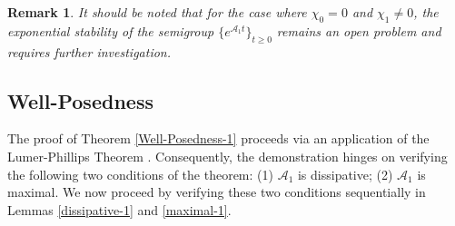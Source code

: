 \documentclass[11pt,reqno]{article}
\newtheorem{remark}[theorem]{Remark}
\begin{document}
    \begin{remark}
  	It should be noted that for the case where $\chi_0 = 0$ and $\chi_1 \neq 0$, the exponential stability of the semigroup $\{e^{\mathcal{A}_1 t}\}_{t \geq 0}$ remains an open problem and requires further investigation.
  \end{remark}

\subsection{Well-Posedness}\label{sec2.1}
The proof of Theorem \ref{Well-Posedness-1} proceeds via an application of the Lumer-Phillips Theorem \cite{MR710486}. Consequently, the demonstration hinges on verifying the following two conditions of the theorem: (1) $\mathcal{A}_1$ is dissipative; (2) $\mathcal{A}_1$ is maximal. We now proceed by verifying these two conditions sequentially in Lemmas \ref{dissipative-1} and \ref{maximal-1}.
\end{document}
